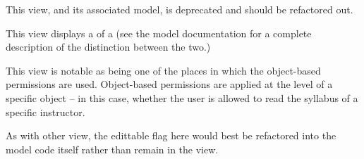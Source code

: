 \documentclass[letterpaper,10pt,english]{sphinxmanual}
\begin{document}

\begin{fulllineitems}
\label{generated/apps.profiles.views:apps.profiles.views.view_project_profile}
This view, and its associated  model, is deprecated and should
be refactored out.

\end{fulllineitems}



\begin{fulllineitems}
\label{generated/apps.profiles.views:apps.profiles.views.view_section}
This view displays a  of a  (see the model
documentation for a complete description of the distinction between
the two.)

This view is notable as being one of the places in which the object-based
permissions are used.  Object-based permissions are applied at the level of
a specific object -- in this case, whether the user is allowed to read the
syllabus of a specific instructor.

As with other view, the edittable flag here would best be refactored into the
model code itself rather than remain in the view.

\end{fulllineitems}


\end{document}
